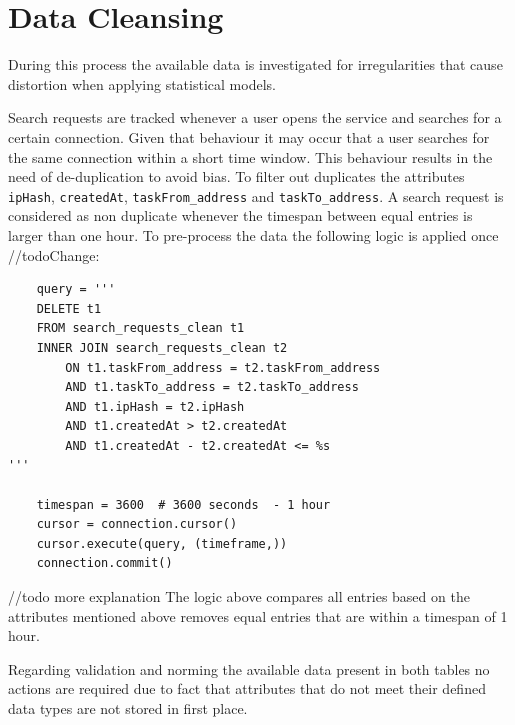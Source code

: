 \section{Data Cleansing}
\label{sec:data_cleansing}
During this process the available data is investigated for irregularities that cause distortion when applying statistical models. 

Search requests are tracked whenever a user opens the service and searches for a certain connection. Given that behaviour it may occur that a user searches for the same connection within a short time window. This behaviour results in the need of de-duplication to avoid bias. To filter out duplicates the attributes \verb|ipHash|, \verb|createdAt|, \verb|taskFrom_address| and \verb|taskTo_address|. A search request is considered as non duplicate whenever the timespan between equal entries is larger than one hour. 
To pre-process the data the following logic is applied once //todoChange: 
\begin{lstlisting}
    query = '''
    DELETE t1
    FROM search_requests_clean t1
    INNER JOIN search_requests_clean t2
        ON t1.taskFrom_address = t2.taskFrom_address
        AND t1.taskTo_address = t2.taskTo_address
        AND t1.ipHash = t2.ipHash
        AND t1.createdAt > t2.createdAt
        AND t1.createdAt - t2.createdAt <= %s
'''

    timespan = 3600  # 3600 seconds  - 1 hour
    cursor = connection.cursor()
    cursor.execute(query, (timeframe,))
    connection.commit()
\end{lstlisting}

//todo more explanation
The logic above compares all entries based on the attributes mentioned above removes equal entries that are within a timespan of 1 hour. 

Regarding validation and norming the available data present in both tables no actions are required due to fact that attributes that do not meet their defined data types are not stored in first place. 

